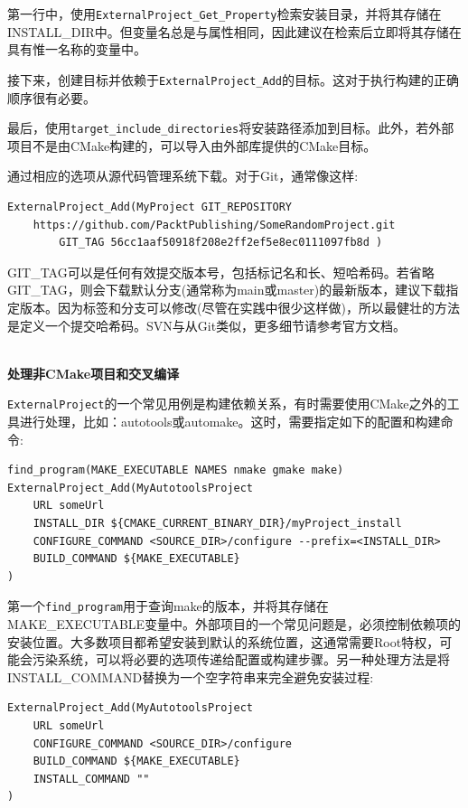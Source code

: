 第一行中，使用\texttt{ExternalProject\_Get\_Property}检索安装目录，并将其存储在INSTALL\_DIR中。但变量名总是与属性相同，因此建议在检索后立即将其存储在具有惟一名称的变量中。

接下来，创建目标并依赖于\texttt{ExternalProject\_Add}的目标。这对于执行构建的正确顺序很有必要。

最后，使用\texttt{target\_include\_directories}将安装路径添加到目标。此外，若外部项目不是由CMake构建的，可以导入由外部库提供的CMake目标。

通过相应的选项从源代码管理系统下载。对于Git，通常像这样:

\begin{lstlisting}[style=styleCMake]
ExternalProject_Add(MyProject GIT_REPOSITORY
	https://github.com/PacktPublishing/SomeRandomProject.git
		GIT_TAG 56cc1aaf50918f208e2ff2ef5e8ec0111097fb8d )
\end{lstlisting}

GIT\_TAG可以是任何有效提交版本号，包括标记名和长、短哈希码。若省略GIT\_TAG，则会下载默认分支(通常称为main或master)的最新版本，建议下载指定版本。因为标签和分支可以修改(尽管在实践中很少这样做)，所以最健壮的方法是定义一个提交哈希码。SVN与从Git类似，更多细节请参考官方文档。

\hspace*{\fill} \\ %
\noindent
\textbf{处理非CMake项目和交叉编译}

\texttt{ExternalProject}的一个常见用例是构建依赖关系，有时需要使用CMake之外的工具进行处理，比如：autotools或automake。这时，需要指定如下的配置和构建命令:

\begin{lstlisting}[style=styleCMake]
find_program(MAKE_EXECUTABLE NAMES nmake gmake make)
ExternalProject_Add(MyAutotoolsProject
	URL someUrl
	INSTALL_DIR ${CMAKE_CURRENT_BINARY_DIR}/myProject_install
	CONFIGURE_COMMAND <SOURCE_DIR>/configure --prefix=<INSTALL_DIR>
	BUILD_COMMAND ${MAKE_EXECUTABLE}
)
\end{lstlisting}

第一个\texttt{find\_program}用于查询make的版本，并将其存储在MAKE\_EXECUTABLE变量中。外部项目的一个常见问题是，必须控制依赖项的安装位置。大多数项目都希望安装到默认的系统位置，这通常需要Root特权，可能会污染系统，可以将必要的选项传递给配置或构建步骤。另一种处理方法是将INSTALL\_COMMAND替换为一个空字符串来完全避免安装过程:

\begin{lstlisting}[style=styleCMake]
ExternalProject_Add(MyAutotoolsProject
	URL someUrl
	CONFIGURE_COMMAND <SOURCE_DIR>/configure
	BUILD_COMMAND ${MAKE_EXECUTABLE}
	INSTALL_COMMAND ""
)
\end{lstlisting}

